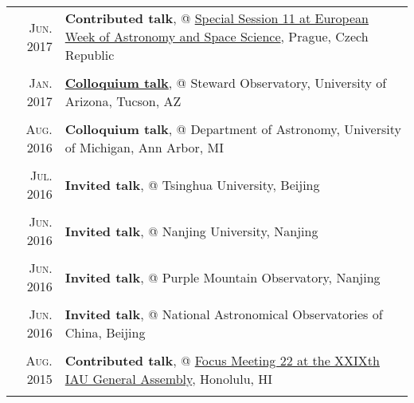\documentclass[letterpaper,10pt]{article}
\newcommand{\textwrap}{5.8in}       %
\begin{document}
\begin{longtable}{r|p{\textwrap}}

    \textsc{Jun. 2017}   &   \textbf{Contributed talk}, @
    \href{http://eas.unige.ch/EWASS2017/session.jsp?id=SS11}{Special Session 11 at
    European Week of Astronomy and Space Science}, Prague, Czech Republic   \\
    \multicolumn{2}{c}{} \\

    \textsc{Jan. 2017}   &   \href{http://mingus.as.arizona.edu/~bjw/galaxy_group/2017spring.html}{\textbf{Colloquium talk}}, @ Steward Observatory, University of Arizona, Tucson, AZ \\
    \multicolumn{2}{c}{} \\

    \textsc{Aug. 2016}   &   \textbf{Colloquium talk}, @ Department of Astronomy, University of Michigan, Ann Arbor, MI \\
    \multicolumn{2}{c}{} \\

    \textsc{Jul. 2016}   &   \textbf{Invited talk}, @ Tsinghua University, Beijing \\
    \multicolumn{2}{c}{} \\

    \textsc{Jun. 2016}   &   \textbf{Invited talk}, @ Nanjing University, Nanjing \\
    \multicolumn{2}{c}{} \\

    \textsc{Jun. 2016}   &   \textbf{Invited talk}, @ Purple Mountain Observatory, Nanjing \\
    \multicolumn{2}{c}{} \\

    \textsc{Jun. 2016}   &   \textbf{Invited talk}, @ National Astronomical Observatories of China, Beijing   \\
    \multicolumn{2}{c}{} \\

    \textsc{Aug. 2015}   &   \textbf{Contributed talk}, @ \href{http://hffiau.epfl.ch/page-116896.html}{Focus Meeting 22 at the XXIXth IAU General Assembly}, Honolulu, HI     \\
    \multicolumn{2}{c}{} \\


\end{longtable}
\end{document}
